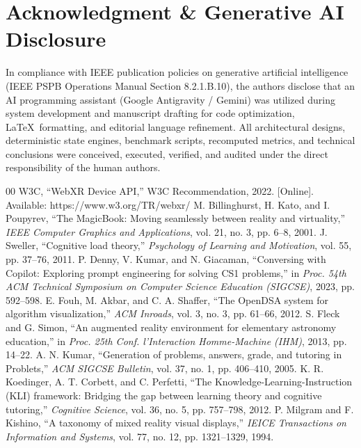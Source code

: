 \documentclass[conference]{IEEEtran}
\begin{document}
\section*{Acknowledgment \& Generative AI Disclosure}
In compliance with IEEE publication policies on generative artificial intelligence (IEEE PSPB Operations Manual Section 8.2.1.B.10), the authors disclose that an AI programming assistant (Google Antigravity / Gemini) was utilized during system development and manuscript drafting for code optimization, \LaTeX\ formatting, and editorial language refinement. All architectural designs, deterministic state engines, benchmark scripts, recomputed metrics, and technical conclusions were conceived, executed, verified, and audited under the direct responsibility of the human authors.


\begin{thebibliography}{00}
 W3C, ``WebXR Device API,'' W3C Recommendation, 2022. [Online]. Available: https://www.w3.org/TR/webxr/
 M. Billinghurst, H. Kato, and I. Poupyrev, ``The MagicBook: Moving seamlessly between reality and virtuality,'' \emph{IEEE Computer Graphics and Applications}, vol. 21, no. 3, pp. 6--8, 2001.
 J. Sweller, ``Cognitive load theory,'' \emph{Psychology of Learning and Motivation}, vol. 55, pp. 37--76, 2011.
 P. Denny, V. Kumar, and N. Giacaman, ``Conversing with Copilot: Exploring prompt engineering for solving CS1 problems,'' in \emph{Proc. 54th ACM Technical Symposium on Computer Science Education (SIGCSE)}, 2023, pp. 592--598.
 E. Fouh, M. Akbar, and C. A. Shaffer, ``The OpenDSA system for algorithm visualization,'' \emph{ACM Inroads}, vol. 3, no. 3, pp. 61--66, 2012.
 S. Fleck and G. Simon, ``An augmented reality environment for elementary astronomy education,'' in \emph{Proc. 25th Conf. l'Interaction Homme-Machine (IHM)}, 2013, pp. 14--22.
 A. N. Kumar, ``Generation of problems, answers, grade, and tutoring in Problets,'' \emph{ACM SIGCSE Bulletin}, vol. 37, no. 1, pp. 406--410, 2005.
 K. R. Koedinger, A. T. Corbett, and C. Perfetti, ``The Knowledge-Learning-Instruction (KLI) framework: Bridging the gap between learning theory and cognitive tutoring,'' \emph{Cognitive Science}, vol. 36, no. 5, pp. 757--798, 2012.
 P. Milgram and F. Kishino, ``A taxonomy of mixed reality visual displays,'' \emph{IEICE Transactions on Information and Systems}, vol. 77, no. 12, pp. 1321--1329, 1994.

\end{thebibliography}
\end{document}
